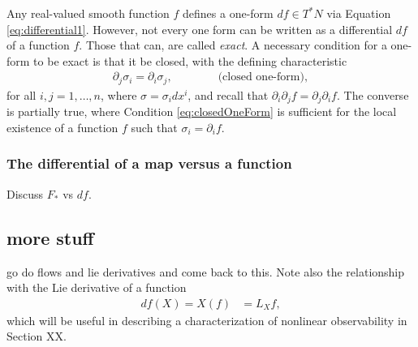 \documentclass[psamsfonts]{amsart}
\theoremstyle{definition}
\theoremstyle{remark}
\numberwithin{equation}{section}
\begin{document}
Any real-valued smooth function $f$ defines a one-form $df\in T^*N$ via Equation \ref{eq:differential1}. However, not every one form can be written as a differential $df$ of a function $f$. Those that can, are called \textit{exact}. A necessary condition for a one-form to be exact is that it be closed, with the defining characteristic 
\begin{align}\label{eq:closedOneForm}
\partial_j \sigma_i = \partial_i \sigma_j, \qquad \qquad \text{(closed one-form)},
\end{align}
 for all $i, j = 1, \dots, n$, where $\sigma = \sigma_i dx^i$, and recall that $\partial_i \partial_j f = \partial_j \partial_i f$. The converse is partially true, where Condition \ref{eq:closedOneForm} is sufficient for the local existence of a function $f$ such that $\sigma_i = \partial_i f$. 

\subsubsection{The differential of a map versus a function}
Discuss $F_*$ vs $df$. 


\subsection{more stuff}
{\color{red}go do flows and lie derivatives and come back to this.} Note also the relationship with the Lie derivative of a function 
\begin{align}\label{eq:dfX_LXf}
df(X) = X(f) &={} L_Xf,
\end{align}
{\color{red}which will be useful in describing a characterization of nonlinear observability in Section XX.}
\end{document}
